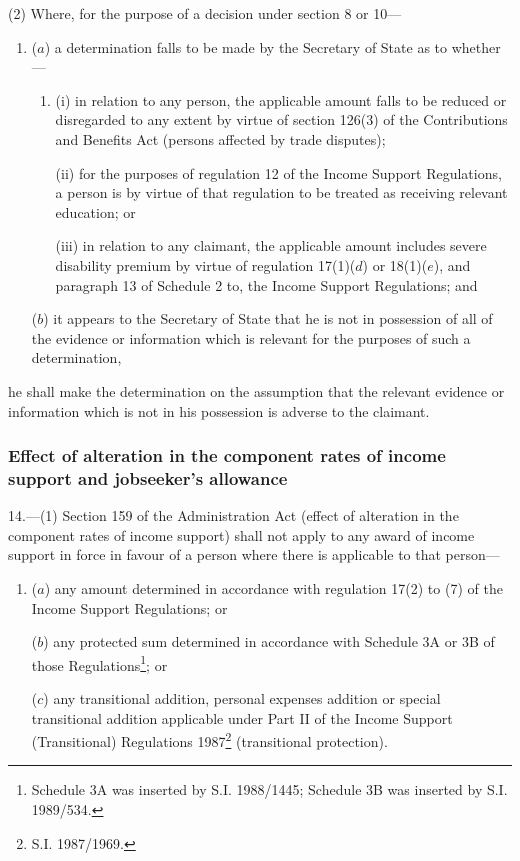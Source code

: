\documentclass[12pt,a4paper]{article}
\begin{document}
(2) Where, for the purpose of a decision under section 8 or 10—
\begin{enumerate}\item[]
($a$) a determination falls to be made by the Secretary of State as to whether—
\begin{enumerate}\item[]
(i) in relation to any person, the applicable amount falls to be reduced or disregarded to any extent by virtue of section 126(3) of the Contributions and Benefits Act (persons affected by trade disputes);

(ii) for the purposes of regulation 12 of the Income Support Regulations, a person is by virtue of that regulation to be treated as receiving relevant education; or

(iii) in relation to any claimant, the applicable amount includes severe disability premium by virtue of regulation 17(1)($d$) or 18(1)($e$), and paragraph 13 of Schedule 2 to, the Income Support Regulations; and
\end{enumerate}

($b$) it appears to the Secretary of State that he is not in possession of all of the evidence or information which is relevant for the purposes of such a determination,
\end{enumerate}
he shall make the determination on the assumption that the relevant evidence or information which is not in his possession is adverse to the claimant.

\subsubsection[14. Effect of alteration in the component rates of income support and jobseeker’s allowance]{Effect of alteration in the component rates of income support and jobseeker’s allowance}

14.—(1) Section 159 of the Administration Act (effect of alteration in the component rates of income support) shall not apply to any award of income support in force in favour of a person where there is applicable to that person—
\begin{enumerate}\item[]
($a$) any amount determined in accordance with regulation 17(2) to (7) of the Income Support Regulations; or

($b$) any protected sum determined in accordance with Schedule 3A or 3B of those Regulations\footnote{\frenchspacing Schedule 3A was inserted by S.I. 1988/1445; Schedule 3B was inserted by S.I. 1989/534.}; or

($c$) any transitional addition, personal expenses addition or special transitional addition applicable under Part II of the Income Support (Transitional) Regulations 1987\footnote{\frenchspacing S.I. 1987/1969.} (transitional protection).
\end{enumerate}
\end{document}
